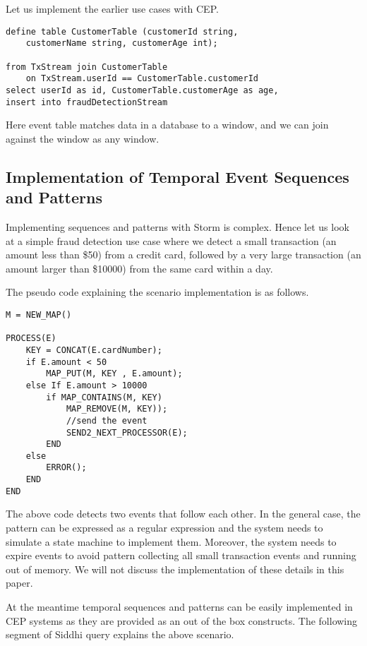\documentclass{sig-alternate}
\begin{document}
{Let us implement the earlier use cases with CEP.

\begin{lstlisting}[mathescape, showstringspaces=false]
define table CustomerTable (customerId string, 
	customerName string, customerAge int);

from TxStream join CustomerTable
	on TxStream.userId == CustomerTable.customerId
select userId as id, CustomerTable.customerAge as age, 
insert into fraudDetectionStream
\end{lstlisting} 

Here event table matches data in a database to a window, and we can join against the window as any window.

\subsection{Implementation of Temporal Event Sequences and Patterns}

Implementing sequences and patterns with Storm is complex. Hence let us look at a simple  fraud detection use case where we detect a small transaction (an amount less than \$50) from a credit card, followed by a very large transaction (an amount larger than \$10000) from the same card within a day. 

The pseudo code explaining the scenario implementation is as follows.
 
\begin{lstlisting}[mathescape,showstringspaces=false]
M = NEW_MAP()

PROCESS(E)  
	KEY = CONCAT(E.cardNumber); 
	if E.amount < 50
		MAP_PUT(M, KEY , E.amount); 
	else If E.amount > 10000
		if MAP_CONTAINS(M, KEY)
			MAP_REMOVE(M, KEY));
			//send the event		     
			SEND2_NEXT_PROCESSOR(E); 
		END
	else
		ERROR();
	END	
END
\end{lstlisting}  
 

The above code detects two events that follow each other. In the general case, the pattern can be expressed as a regular expression and the system needs to simulate a state machine to implement them. Moreover, the system needs to expire events to avoid pattern collecting all small transaction events and running out of memory. We will not discuss the implementation of these details in this paper. 

At the meantime  temporal sequences and patterns can be easily implemented in CEP systems as they are provided as an out of the box constructs. The following segment of Siddhi query explains the above scenario.


}
\end{document}

